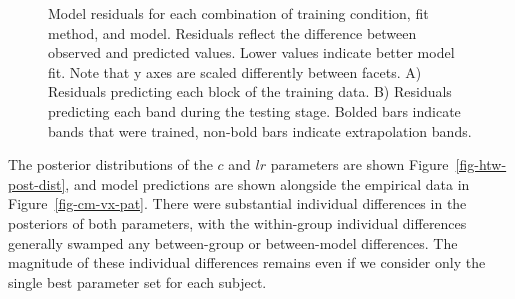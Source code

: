 \documentclass[
  12pt,
  letterpaper,
]{article}
\begin{document}
\begin{figure}


\caption{\label{fig-htw-resid-pred}Model residuals for each combination
of training condition, fit method, and model. Residuals reflect the
difference between observed and predicted values. Lower values indicate
better model fit. Note that y axes are scaled differently between
facets. A) Residuals predicting each block of the training data. B)
Residuals predicting each band during the testing stage. Bolded bars
indicate bands that were trained, non-bold bars indicate extrapolation
bands.}

\end{figure}%

The posterior distributions of the \(c\) and \(lr\) parameters are shown
Figure~\ref{fig-htw-post-dist}, and model predictions are shown
alongside the empirical data in Figure~\ref{fig-cm-vx-pat}. There were
substantial individual differences in the posteriors of both parameters,
with the within-group individual differences generally swamped any
between-group or between-model differences. The magnitude of these
individual differences remains even if we consider only the single best
parameter set for each subject.
\end{document}
